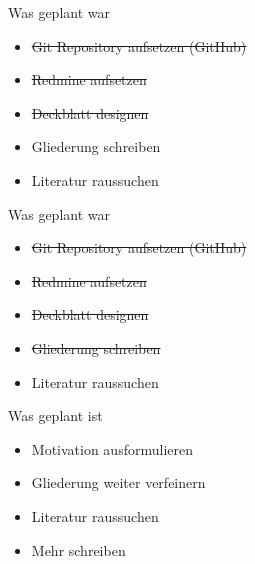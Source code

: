 \documentclass{beamer}
\begin{document}
\begin{frame}{Was geplant war}
  \begin{itemize}
    \item \sout{Git Repository aufsetzen (GitHub)}
    \item \sout{Redmine aufsetzen}
    \item \sout{Deckblatt designen}
    \item Gliederung schreiben
    \item Literatur raussuchen
  \end{itemize}
\end{frame}

\begin{frame}{Was geplant war}
  \begin{itemize}
    \item \sout{Git Repository aufsetzen (GitHub)}
    \item \sout{Redmine aufsetzen}
    \item \sout{Deckblatt designen}
    \item \sout{Gliederung schreiben}
    \item Literatur raussuchen
  \end{itemize}
\end{frame}

\begin{frame}{Was geplant ist}
  \begin{itemize}
    \item Motivation ausformulieren
    \item Gliederung weiter verfeinern
    \item Literatur raussuchen
    \item Mehr schreiben
  \end{itemize}
\end{frame}
\end{document}
